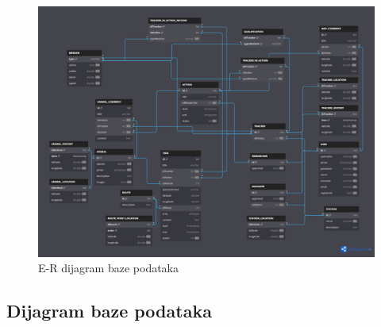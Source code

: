 				
				\begin{figure}
					\vspace{\baselineskip}
					\includegraphics[scale=0.3]{slike/grafBaza.PNG} 
					\centering
					\caption{E-R dijagram baze podataka}
					\label{fig:ERdiagram}
				\end{figure}				
				\restoregeometry
				
			\fi			
										
			
			\subsection{Dijagram baze podataka}			
			
				\vspace{12pt}						
				
